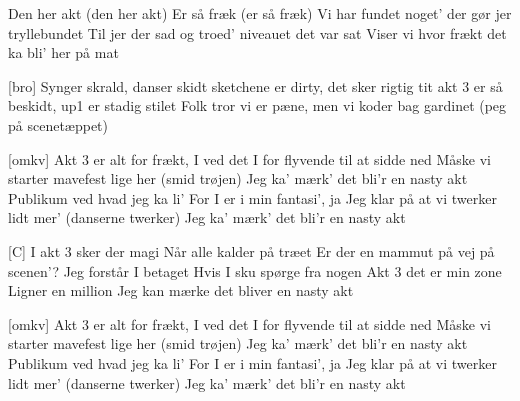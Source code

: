 \documentclass[a4paper,11pt]{article}
\begin{document}
\begin{song}
Den her akt (den her akt)
Er så fræk (er så fræk)
Vi har fundet noget' der gør jer tryllebundet
Til jer der sad og troed' niveauet det var sat
Viser vi hvor frækt det ka bli' her på mat

[bro]
Synger skrald, danser skidt
sketchene er dirty, det sker rigtig tit
akt 3 er så beskidt, up1 er stadig stilet
Folk tror vi er pæne, men vi koder bag gardinet (peg på scenetæppet)

[omkv]
Akt 3 er alt for frækt, I ved det
I for flyvende til at sidde ned
Måske vi starter mavefest lige her (smid trøjen)
Jeg ka' mærk' det bli'r en nasty akt
Publikum ved hvad jeg ka li'
For I er i min fantasi', ja
Jeg klar på at vi twerker lidt mer' (danserne twerker)
Jeg ka' mærk' det bli'r en nasty akt

[C]
I akt 3 sker der magi
Når alle kalder på træet
Er der en mammut på vej på scenen'?
Jeg forstår I betaget
Hvis I sku spørge fra nogen
Akt 3 det er min zone
Ligner en million
Jeg kan mærke det bliver en nasty akt

[omkv]
Akt 3 er alt for frækt, I ved det
I for flyvende til at sidde ned
Måske vi starter mavefest lige her (smid trøjen)
Jeg ka' mærk' det bli'r en nasty akt
Publikum ved hvad jeg ka li'
For I er i min fantasi', ja
Jeg klar på at vi twerker lidt mer' (danserne twerker)
Jeg ka' mærk' det bli'r en nasty akt
\end{song}
\end{document}
